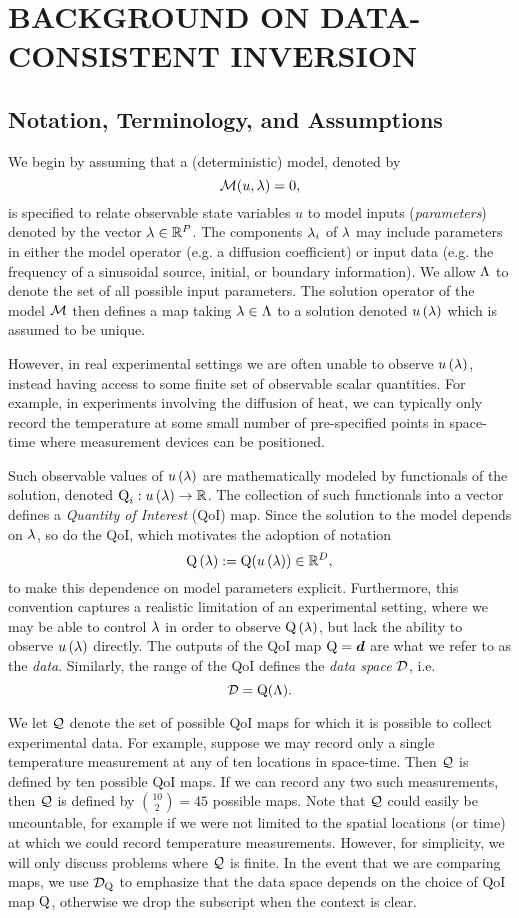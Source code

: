 \chapter{\uppercase{Background on Data-Consistent Inversion} \label{chapter:02}}

\section{Notation, Terminology, and Assumptions}

We begin by assuming that a (deterministic) model, denoted by $$\operatorname*{\mathcal{M}} (u, \lambda) = 0,$$ is specified to relate observable state variables $u$ to model inputs ({\em parameters}) denoted by the vector $\lambda\in\mathbb{R}^P$.
The components $\lambda_i$ of $\lambda$ may include parameters in either the model operator (e.g. a diffusion coefficient) or input data (e.g. the frequency of a sinusoidal source, initial, or boundary information).
We allow $\Lambda$ to denote the set of all possible input parameters.
The solution operator of the model $\operatorname*{\mathcal{M}}$ then defines a map taking $\lambda \in \Lambda$ to a solution denoted $u\operatorname*{\left ( \lambda \right )}$ which is assumed to be unique. 

However, in real experimental settings we are often unable to observe $u\operatorname*{\left ( \lambda \right )}$, instead having access to some finite set of observable scalar quantities. 
For example, in experiments involving the diffusion of heat, we can typically only record the temperature at some small number of pre-specified points in space-time where measurement devices can be positioned.

Such observable values of $u\operatorname*{\left ( \lambda \right )}$ are mathematically modeled by functionals of the solution, denoted $\operatorname*{Q}_i: u\operatorname*{\left ( \lambda \right )} \to \mathbb{R}$.
The collection of such functionals into a vector defines a {\em Quantity of Interest} (QoI) map. 
Since the solution to the model depends on $\lambda$, so do the QoI, which motivates the adoption of notation 
$$\operatorname*{\operatorname*{Q}\operatorname*{\left ( \lambda \right )}} := \operatorname*{Q}( u\operatorname*{\left ( \lambda \right )} ) \in\mathbb{R}^D,$$
to make this dependence on model parameters explicit.
Furthermore, this convention captures a realistic limitation of an experimental setting, where we may be able to control $\lambda$ in order to observe $\operatorname*{Q}\operatorname*{\left ( \lambda \right )}$, but lack the ability to observe $u\operatorname*{\left ( \lambda \right )}$ directly.
The outputs of the QoI map $\operatorname*{Q} = \operatorname*{\boldsymbol{d}}$ are what we refer to as the \emph{data}. Similarly, the range of the QoI defines the \emph{data space} $\mathcal{D}$, i.e. $$\mathcal{D} = \operatorname*{Q}(\Lambda).$$

We let $\mathcal{Q}$ denote the set of possible QoI maps for which it is possible to collect experimental data.
For example, suppose we may record only a single temperature measurement at any of ten locations in space-time.
Then $\mathcal{Q}$ is defined by ten possible QoI maps. 
If we can record any two such measurements, then $\mathcal{Q}$ is defined by $\binom{10}{2} = 45$ possible maps.
Note that $\mathcal{Q}$ could easily be uncountable, for example if we were not limited to the spatial locations (or time) at which we could record temperature measurements.
However, for simplicity, we will only discuss problems where $\mathcal{Q}$ is finite.
In the event that we are comparing maps, we use $\mathcal{D}_{\operatorname*{Q}}$ to emphasize that the data space depends on the choice of QoI map $\operatorname*{Q}$, otherwise we drop the subscript when the context is clear.

